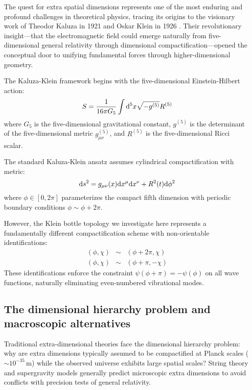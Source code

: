 \documentclass[12pt]{iopart}
\begin{document}
The quest for extra spatial dimensions represents one of the most enduring and profound challenges in theoretical physics, tracing its origins to the visionary work of Theodor Kaluza in 1921 \cite{Kaluza1921} and Oskar Klein in 1926 \cite{Klein1926}. Their revolutionary insight---that the electromagnetic field could emerge naturally from five-dimensional general relativity through dimensional compactification---opened the conceptual door to unifying fundamental forces through higher-dimensional geometry.

The Kaluza-Klein framework begins with the five-dimensional Einstein-Hilbert action:
\begin{equation}
S = \frac{1}{16\pi G_5} \int {\rm d}^5x \sqrt{-g^{(5)}} R^{(5)}
\label{eq:kaluza_klein_action}
\end{equation}
where $G_5$ is the five-dimensional gravitational constant, $g^{(5)}$ is the determinant of the five-dimensional metric $g^{(5)}_{\mu\nu}$, and $R^{(5)}$ is the five-dimensional Ricci scalar.

The standard Kaluza-Klein ansatz assumes cylindrical compactification with metric:
\begin{equation}
{\rm d}s^2 = g_{\mu\nu}(x) {\rm d}x^\mu {\rm d}x^\nu + R^2(t) {\rm d}\phi^2
\label{eq:standard_kk_metric}
\end{equation}
where $\phi \in [0, 2\pi]$ parameterizes the compact fifth dimension with periodic boundary conditions $\phi \sim \phi + 2\pi$.

However, the Klein bottle topology we investigate here represents a fundamentally different compactification scheme with non-orientable identifications:
\begin{eqnarray}
(\phi, \chi) &\sim& (\phi + 2\pi, \chi) \label{eq:klein_id1}\\
(\phi, \chi) &\sim& (\phi + \pi, -\chi) \label{eq:klein_id2}
\end{eqnarray}
These identifications enforce the constraint $\psi(\phi + \pi) = -\psi(\phi)$ on all wave functions, naturally eliminating even-numbered vibrational modes.

\subsection{The dimensional hierarchy problem and macroscopic alternatives}

Traditional extra-dimensional theories face the dimensional hierarchy problem: why are extra dimensions typically assumed to be compactified at Planck scales ($\sim 10^{-35}\,\mathrm{m}$) while the observed universe exhibits large spatial scales? String theory and supergravity models generally predict microscopic extra dimensions to avoid conflicts with precision tests of general relativity.
\end{document}
